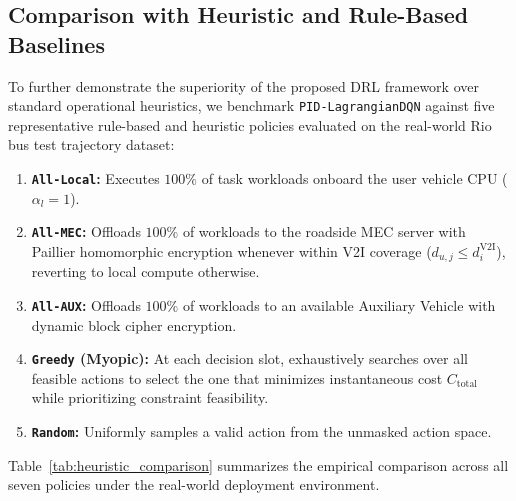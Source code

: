 \documentclass[12pt,a4paper]{article}
\begin{document}
\subsection{Comparison with Heuristic and Rule-Based Baselines}
To further demonstrate the superiority of the proposed DRL framework over standard operational heuristics, we benchmark \texttt{PID-LagrangianDQN} against five representative rule-based and heuristic policies evaluated on the real-world Rio bus test trajectory dataset:
\begin{enumerate}
    \item \textbf{\texttt{All-Local}:} Executes $100\%$ of task workloads onboard the user vehicle CPU ($\alpha_l = 1$).
    \item \textbf{\texttt{All-MEC}:} Offloads $100\%$ of workloads to the roadside MEC server with Paillier homomorphic encryption whenever within V2I coverage ($d_{u,j} \le d_i^{\mathrm{V2I}}$), reverting to local compute otherwise.
    \item \textbf{\texttt{All-AUX}:} Offloads $100\%$ of workloads to an available Auxiliary Vehicle with dynamic block cipher encryption.
    \item \textbf{\texttt{Greedy} (Myopic):} At each decision slot, exhaustively searches over all feasible actions to select the one that minimizes instantaneous cost $C_{\mathrm{total}}$ while prioritizing constraint feasibility.
    \item \textbf{\texttt{Random}:} Uniformly samples a valid action from the unmasked action space.
\end{enumerate}

Table~\ref{tab:heuristic_comparison} summarizes the empirical comparison across all seven policies under the real-world deployment environment.
\end{document}
